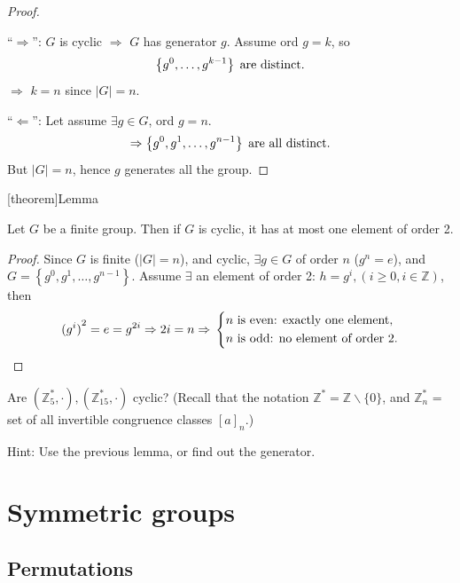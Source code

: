 \documentclass[12pt]{report}
\theoremstyle{definition}
\begin{document}
\begin{proof}
    \,

    ``$\Rightarrow$'': $G$ is cyclic $\Rightarrow$ $G$ has generator $g$.
    Assume ord $g = k$, so\[
        \left\{g^0, \ldots, g^{k-1}\right\} \;\textnormal{are distinct}.
    \]
    $\Rightarrow$ $k = n$ since $|G| = n$.
    
    ``$\Leftarrow$'': Let assume $\exists g \in G$, ord $g = n$.
   \[
       \Rightarrow \left\{g^{0}, g^{1}, \ldots, g^{n - 1}\right\} \;\textnormal{are all distinct.}
   \]
   But $|G| = n$, hence $g$ generates all the group.
\end{proof}

[theorem]{Lemma}
\begin{order 2 of element of cyclic group}
    Let $G$ be a finite group. Then if $G$ is cyclic, it has at most one element of order 2.
\end{order 2 of element of cyclic group}

\begin{proof}
    Since $G$ is finite ($|G| = n$), and cyclic, $\exists g \in{}G$ of order $n$ ($g^{n} = e$),
    and $G = \left\{g^{0}, g^{1}, \ldots, g^{n-1}\right\} $.
    Assume $\exists$ an element of order 2: $h = g^{i}, (i \ge{}0, i \in{}\mathbb{Z})$, then\[
        {(g^{i})}^{2} = e = g^{2i} \Rightarrow{}2i = n \Rightarrow{}
        \left\{\begin{align*}
            & \textnormal{$n$ is even: exactly one element,} \\
            & \textnormal{$n$ is odd: no element of order 2.}
        \end{align*}\right.
    \]
\end{proof}

\begin{ex}
    Are $(\mathbb{Z}^{*}_5, \cdot), (\mathbb{Z}^{*}_{15}, \cdot)$ cyclic?
    (Recall that the notation $\mathbb{Z}^{*} = \mathbb{Z} \backslash\{0\}$,
    and $\mathbb{Z}_n^{*}$ = set of all invertible congruence classes ${[a]}_{n}$.)

    Hint: Use the previous lemma, or find out the generator.
\end{ex}


\section{Symmetric groups}

\subsection{Permutations}
\end{document}
